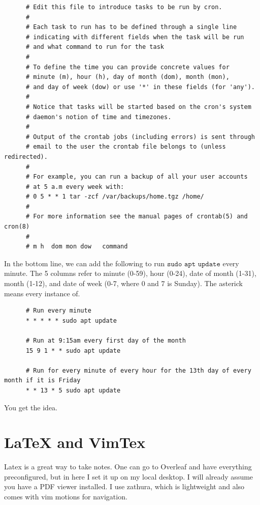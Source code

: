 \documentclass{article}
\begin{document}
    \begin{lstlisting}
      # Edit this file to introduce tasks to be run by cron.
      # 
      # Each task to run has to be defined through a single line
      # indicating with different fields when the task will be run
      # and what command to run for the task
      # 
      # To define the time you can provide concrete values for
      # minute (m), hour (h), day of month (dom), month (mon),
      # and day of week (dow) or use '*' in these fields (for 'any').
      # 
      # Notice that tasks will be started based on the cron's system
      # daemon's notion of time and timezones.
      # 
      # Output of the crontab jobs (including errors) is sent through
      # email to the user the crontab file belongs to (unless redirected).
      # 
      # For example, you can run a backup of all your user accounts
      # at 5 a.m every week with:
      # 0 5 * * 1 tar -zcf /var/backups/home.tgz /home/
      # 
      # For more information see the manual pages of crontab(5) and cron(8)
      # 
      # m h  dom mon dow   command
    \end{lstlisting}

    In the bottom line, we can add the following to run $\texttt{sudo apt update}$ every minute. The 5 columns refer to minute (0-59), hour (0-24), date of month (1-31), month (1-12), and date of week (0-7, where 0 and 7 is Sunday). The asterick means every instance of. 

    \begin{lstlisting}
      # Run every minute
      * * * * * sudo apt update 

      # Run at 9:15am every first day of the month 
      15 9 1 * * sudo apt update

      # Run for every minute of every hour for the 13th day of every month if it is Friday
      * * 13 * 5 sudo apt update
    \end{lstlisting}
    You get the idea. 

\section{LaTeX and VimTex} 

  Latex is a great way to take notes. One can go to Overleaf and have everything preconfigured, but in here I set it up on my local desktop. I will already assume you have a PDF viewer installed. I use zathura, which is lightweight and also comes with vim motions for navigation. 
\end{document}

